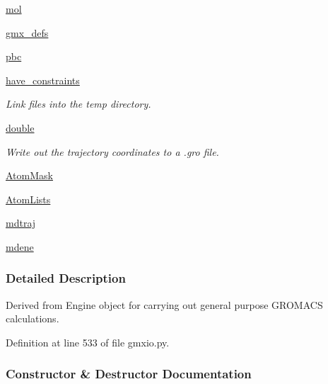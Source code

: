 \begin{DoxyCompactItemize}
\hyperlink{classsrc_1_1gmxio_1_1GMX_aefbef8e64c33b07808f14733780712a2}{mol}
\item 
\hyperlink{classsrc_1_1gmxio_1_1GMX_a4739a21d2bd0b02f69e4fa2c3d831849}{gmx\+\_\+defs}
\item 
\hyperlink{classsrc_1_1gmxio_1_1GMX_a73bfde9773109c13b0f11eadd215cc1e}{pbc}
\item 
\hyperlink{classsrc_1_1gmxio_1_1GMX_a9f08fa57b1b204a3e7c77b01aae38989}{have\+\_\+constraints}
\begin{DoxyCompactList}\small\item\em Link files into the temp directory. \end{DoxyCompactList}\item 
\hyperlink{classsrc_1_1gmxio_1_1GMX_a3554ea6c9cab32e582a5ebeeb48b94da}{double}
\begin{DoxyCompactList}\small\item\em Write out the trajectory coordinates to a .gro file. \end{DoxyCompactList}\item 
\hyperlink{classsrc_1_1gmxio_1_1GMX_a23a0c5f383f369b3d45a85f600d42757}{Atom\+Mask}
\item 
\hyperlink{classsrc_1_1gmxio_1_1GMX_a6d192dedcf63a9d71896f18813131ebd}{Atom\+Lists}
\item 
\hyperlink{classsrc_1_1gmxio_1_1GMX_a9a7a0b53e21750c13600ec30b70d69fe}{mdtraj}
\item 
\hyperlink{classsrc_1_1gmxio_1_1GMX_a9480881bb53654a82cf1b9abf736b123}{mdene}
\end{DoxyCompactItemize}


\subsubsection{Detailed Description}
Derived from Engine object for carrying out general purpose G\+R\+O\+M\+A\+CS calculations. 



Definition at line 533 of file gmxio.\+py.



\subsubsection{Constructor \& Destructor Documentation}
\mbox{\label{classsrc_1_1gmxio_1_1GMX_aa29d0675a8429d93d3a9ebf5b9634c32}} 
